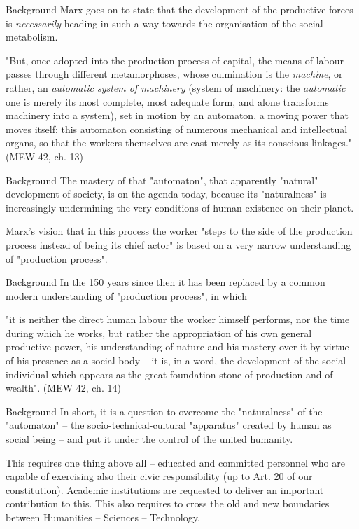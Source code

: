 \documentclass{beamer}
\begin{document}
\begin{frame}{Background}
Marx goes on to state that the development of the productive forces is
\emph{necessarily} heading in such a way towards the organisation of the
social metabolism.

"But, once adopted into the production process of capital, the means of labour
passes through different metamorphoses, whose culmination is the
\emph{machine}, or rather, an \emph{automatic system of machinery} (system of
machinery: the \emph{automatic} one is merely its most complete, most adequate
form, and alone transforms machinery into a system), set in motion by an
automaton, a moving power that moves itself; this automaton consisting of
numerous mechanical and intellectual organs, so that the workers themselves
are cast merely as its conscious linkages." (MEW 42, ch. 13)
\end{frame}

\begin{frame}{Background}
The mastery of that "automaton", that apparently "natural" development of
society, is on the agenda today, because its "naturalness" is increasingly
undermining the very conditions of human existence on their planet.

Marx's vision that in this process the worker "steps to the side of the
production process instead of being its chief actor" is based on a very narrow
understanding of "production process".
\end{frame}

\begin{frame}{Background}
In the 150 years since then it has been replaced by a common modern
understanding of "production process", in which

"it is neither the direct human labour the worker himself performs, nor the
time during which he works, but rather the appropriation of his own general
productive power, his understanding of nature and his mastery over it by
virtue of his presence as a social body – it is, in a word, the development of
the social individual which appears as the great foundation-stone of
production and of wealth". (MEW 42, ch. 14)
\end{frame}

\begin{frame}{Background}
In short, it is a question to overcome the "naturalness" of the "automaton" --
the socio-technical-cultural "apparatus" created by human as social being  --
and put it under the control of the united humanity.

This requires one thing above all -- educated and committed personnel who are
capable of exercising also their civic responsibility (up to Art. 20 of our
constitution).  Academic institutions are requested to deliver an important
contribution to this.  This also requires to cross the old and new boundaries
between Humanities -- Sciences -- Technology.
\end{frame}
\end{document}
